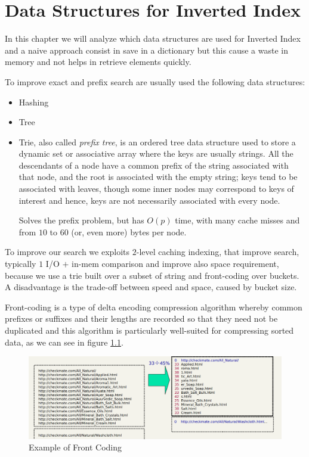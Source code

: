 \chapter{Data Structures for Inverted Index}
In this chapter we will analyze which data structures are used for Inverted Index and a naive approach 
consist in save in a dictionary but this cause a waste in memory and not helps in retrieve elements quickly.

To improve exact and prefix search are usually used the following data structures:
\begin{itemize}
	\item Hashing
	\item Tree
	\item Trie, also called \emph{prefix tree}, is an ordered tree data structure used to store a dynamic set
	      or associative array where the keys are usually strings.\newline
	      All the descendants of a node have a common prefix of the string associated with that node,
	      and the root is associated with the empty string; keys tend to be associated with leaves,
	      though some inner nodes may correspond to keys of interest and hence, keys are not necessarily
	      associated with every node.

	      Solves the prefix problem, but has $O(p)$ time, with many cache misses and from $10$ to $60$ (or, even more) bytes per node.

\end{itemize}
To improve our search we exploits $2$-level caching indexing, that improve search, typically $1$ I/O $+$ in-mem comparison and 
improve also space requirement, because we use a trie built over a subset of string and front-coding over buckets.\newline
A disadvantage is the trade-off between speed and space, caused by bucket size.

Front-coding is a type of delta encoding compression algorithm whereby common prefixes or suffixes and their lengths 
are recorded so that they need not be duplicated and this algorithm is particularly well-suited for compressing sorted data,
as we can see in figure \ref{img:front-coding}.

\begin{figure}
	\caption{Example of Front Coding}
	\label{img:front-coding}
	\includegraphics[width=\textwidth]{Images/frontCoding}
\end{figure}

